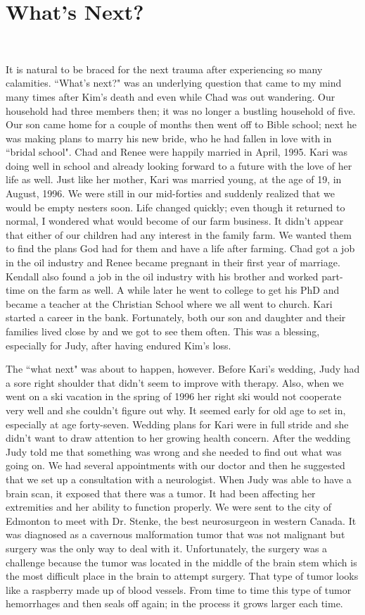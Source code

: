 \documentclass[oneside]{book}
\begin{document}
\section{What's Next?}
\

It is natural to be braced for the next trauma after experiencing so many calamities. ``What's next?" was an underlying question that came to my mind many times after Kim's death and even while Chad was out wandering. Our household had three members then; it was no longer a bustling household of five. Our son came home for a couple of months then went off to Bible school; next he was making plans to marry his new bride, who he had fallen in love with in ``bridal school". Chad and Renee were happily married in April, 1995. Kari was doing well in school and already looking forward to a future with the love of her life as well. Just like her mother, Kari was married young, at the age of 19, in August, 1996. We were still in our mid-forties and suddenly realized that we would be empty nesters soon. Life changed quickly; even though it returned to normal, I wondered what would become of our farm business. It didn't appear that either of our children had any interest in the family farm. We wanted them to find the plans God had for them and have a life after farming. Chad got a job in the oil industry and Renee became pregnant in their first year of marriage. Kendall also found a job in the oil industry with his brother and worked part-time on the farm as well. A while later he went to college to get his PhD and became a teacher at the Christian School where we all went to church. Kari started a career in the bank. Fortunately, both our son and daughter and their families lived close by and we got to see them often. This was a blessing, especially for Judy, after having endured Kim's loss.

The ``what next" was about to happen, however. Before Kari's wedding, Judy had a sore right shoulder that didn't seem to improve with therapy. Also, when we went on a ski vacation in the spring of 1996 her right ski would not cooperate very well and she couldn't figure out why. It  seemed early for old age to set in, especially at age forty-seven. Wedding plans for Kari were in full stride and she didn't want to draw attention to her growing health concern. After the wedding Judy told me that something was wrong and she needed to find out what was going on. We had several appointments with our doctor and then he suggested that we set up a consultation with a neurologist. When Judy was able to have a brain scan, it exposed that there was a tumor. It had been affecting her extremities and her ability to function properly. We were sent to the city of Edmonton to meet with Dr. Stenke, the best neurosurgeon in western Canada. It was diagnosed as a cavernous malformation tumor that was not malignant but surgery was the only way to deal with it. Unfortunately, the surgery was a challenge because the tumor was located in the middle of the brain stem which is the most difficult place in the brain to attempt surgery. That type of tumor looks like a raspberry made up of blood vessels. From time to time this type of tumor hemorrhages and then seals off again; in the process it grows larger each time.
\end{document}
